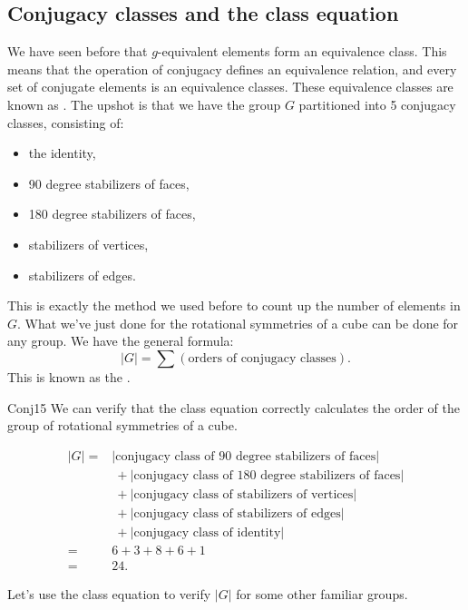 \subsection*{Conjugacy classes and the class equation}

We have seen before that $g$-equivalent elements form an equivalence class. This means that the operation of conjugacy defines an equivalence relation, and every set of conjugate elements is an equivalence classes. These equivalence classes are known as .
The upshot is that we have the group $G$ partitioned into 5 conjugacy classes, consisting of: 
\begin{itemize}
\item
the identity, 
\item
90 degree stabilizers of faces, 
\item
180 degree stabilizers of faces, 
\item
stabilizers of vertices, 
\item
stabilizers of edges. 
\end{itemize}

This is exactly the method we used before to count up the number of elements in $G$.  
What we've just done for the rotational symmetries of a cube can be done for any group.  We have the general formula:
$$|G| = \sum (\text{orders of conjugacy classes}).$$
This is known as the .

\begin{example}{Conj15}
  We can verify that the class equation correctly calculates the order of the group of rotational symmetries of a cube. 

\begin{align*}
|G|=&|\text{conjugacy class of 90 degree stabilizers of faces}| \\
&~+|\text{conjugacy class of 180 degree stabilizers of faces}|\\
&~+|\text{conjugacy class of stabilizers of vertices}|\\
&~+|\text{conjugacy class of stabilizers of edges}|\\
&~+|\text{conjugacy class of identity}|\\
=&6+3+8+6+1\\
=&24.
\end{align*}
\end{example}

Let's use the class equation to verify $|G|$ for some other familiar groups.  

